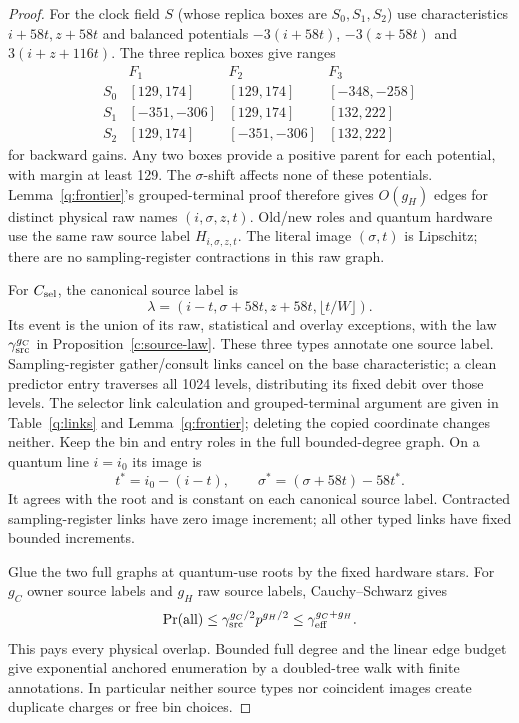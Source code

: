 \begin{proof}
For the clock field \(S\) (whose replica boxes are \(S_0,S_1,S_2\)) use characteristics \(i+58t,z+58t\) and balanced potentials
\(-3(i+58t)\), \(-3(z+58t)\) and \mbox{\(3(i+z+116t)\)}. The three replica boxes give
ranges
\[
\begin{array}{crrr}
 &F_1&F_2&F_3\\
 S_0 &[129,174]&[129,174]&[-348,-258]\\
 S_1 &[-351,-306]&[129,174]&[132,222]\\
 S_2 &[129,174]&[-351,-306]&[132,222]
\end{array}
\]
for backward gains. Any two boxes provide a positive parent for each
potential, with margin at least 129. The \(\sigma\)-shift affects none
of these potentials. Lemma~\ref{q:frontier}'s grouped-terminal proof
therefore gives \(O(g_H)\) edges for distinct physical raw names
\((i,\sigma,z,t)\). Old/new roles and quantum hardware use the same
raw source label \(H_{i,\sigma,z,t}\). The literal image \((\sigma,t)\)
is Lipschitz; there are no sampling-register contractions in this raw graph.

For \(C_{\rm sel}\), the canonical source label is
\[
 \lambda=(i-t,\sigma+58t,z+58t,\lfloor t/W\rfloor).
\]
Its event is the union of its raw, statistical and overlay exceptions,
with the law \(\gamma_{\rm src}^{g_C}\) in Proposition~\ref{c:source-law}.
These three types annotate one source label. Sampling-register gather/consult links cancel
on the base characteristic; a clean predictor entry traverses all
1024 levels, distributing its fixed debit over those levels.
The selector link calculation and grouped-terminal argument are given
in Table~\ref{q:links} and Lemma~\ref{q:frontier}; deleting the copied
coordinate changes neither. Keep the bin and entry roles in the full
bounded-degree graph. On a quantum line \(i=i_0\) its image is
\[
 t^*=i_0-(i-t),\qquad
 \sigma^*=(\sigma+58t)-58t^*.
\]
It agrees with the root and is constant on each canonical source label.
Contracted sampling-register links have zero image increment; all other typed
links have fixed bounded increments.

Glue the two full graphs at quantum-use roots by the fixed
hardware stars. For \(g_C\) owner source labels and \(g_H\) raw source labels,
Cauchy--Schwarz gives
\[
 \Pr(\text{all})\le\gamma_{\rm src}^{g_C/2}p^{g_H/2}
                  \le\gamma_{\rm eff}^{g_C+g_H}.
\]
This pays every physical overlap. Bounded full degree and the linear
edge budget give exponential anchored enumeration by a doubled-tree
walk with finite annotations. In particular neither source types nor
coincident images create duplicate charges or free bin choices.
\end{proof}

